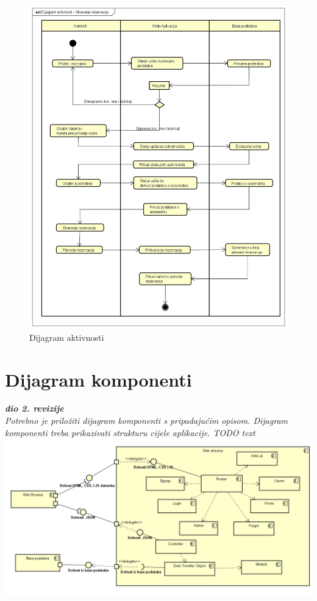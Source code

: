 			\begin{figure}[hp]
                    \centering
                    \includegraphics[width=16cm]{slike/Dijagram_aktivnosti.png}
                    \caption{Dijagram aktivnosti}
                    \label{fig:DA_01}
                \end{figure}
			
			 
			\eject
		\section{Dijagram komponenti}
		
			\textbf{\textit{dio 2. revizije}}\\
		
			 \textit{Potrebno je priložiti dijagram komponenti s pripadajućim opisom. Dijagram komponenti treba prikazivati strukturu cijele aplikacije. TODO text}
			 \centering
			 \includegraphics[width=16cm]{slike/dijagram komponenti.png}